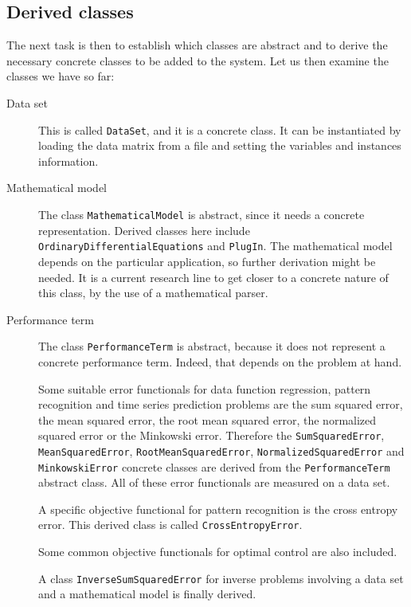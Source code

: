 \subsection*{Derived classes}

The next task is then to establish which classes are abstract and
to derive the necessary concrete classes to be added to the
system. Let us then examine the classes we have so far:

\begin{description}

\item[Data set] This is called \lstinline"DataSet", and it is a concrete class. 
It can be instantiated by loading the data matrix from a file and setting the variables and instances information. 

\item[Mathematical model] The class \lstinline"MathematicalModel" is abstract, since it needs a concrete representation. 
Derived classes here include \lstinline"OrdinaryDifferentialEquations" and \lstinline"PlugIn".
The mathematical model depends on the particular application, so further derivation might be needed. 
It is a current research line to get closer to a concrete nature of this class, by the use of a mathematical parser. 

\item[Performance term] The class \lstinline"PerformanceTerm" is abstract, because it does
not represent a concrete performance term. Indeed, that depends on the problem at hand. 

Some suitable error functionals for data function regression, pattern recognition and time series prediction problems are the sum squared error, the mean squared error, the root mean squared error, the normalized squared error or the Minkowski error. Therefore the \lstinline"SumSquaredError", \lstinline"MeanSquaredError", \lstinline"RootMeanSquaredError", \lstinline"NormalizedSquaredError" and \lstinline"MinkowskiError" concrete classes are derived from the \lstinline"PerformanceTerm" abstract class. 
All of these error functionals are measured on a data set. 

A specific objective functional for pattern recognition is the cross entropy error. This derived class is called \lstinline"CrossEntropyError".

Some common objective functionals for optimal control are also included. 

A class \lstinline"InverseSumSquaredError" for inverse problems involving a data set and a mathematical model is finally derived.


\end{description}

